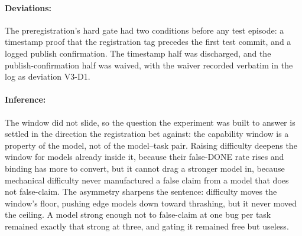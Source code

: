 \paragraph{Deviations:} The preregistration's hard gate had two conditions before any test episode: a timestamp proof that the registration tag precedes the first test commit, and a logged publish confirmation. The timestamp half was discharged, and the publish-confirmation half was waived, with the waiver recorded verbatim in the log as deviation V3-D1.

\paragraph{Inference:} The window did not slide, so the question the experiment was built to answer is settled in the direction the registration bet against: the capability window is a property of the model, not of the model--task pair. Raising difficulty deepens the window for models already inside it, because their false-DONE rate rises and binding has more to convert, but it cannot drag a stronger model in, because mechanical difficulty never manufactured a false claim from a model that does not false-claim. The asymmetry sharpens the sentence: difficulty moves the window's floor, pushing edge models down toward thrashing, but it never moved the ceiling. A model strong enough not to false-claim at one bug per task remained exactly that strong at three, and gating it remained free but useless.
